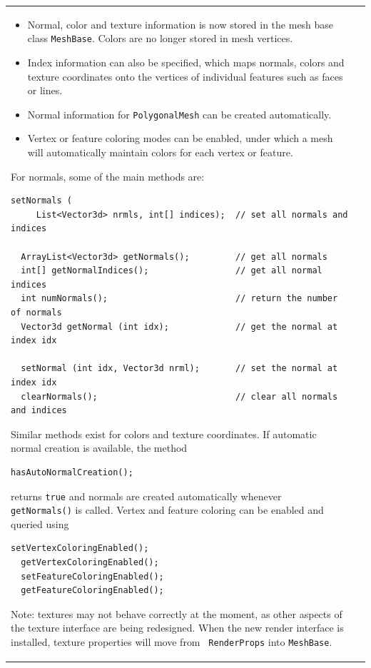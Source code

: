 \documentclass{article}
\begin{document}
\begin{tabular}{ll}
\begin{itemize}

\item Normal, color and texture information is now stored in the mesh
base class {\tt MeshBase}. Colors are no longer stored in mesh vertices.

\item Index information can also be specified, which maps normals,
colors and texture coordinates onto the vertices of individual
features such as faces or lines.

\item Normal information for {\tt PolygonalMesh} can be created
automatically.

\item Vertex or feature coloring modes can be enabled, under which a
mesh will automatically maintain colors for each vertex or feature.

\end{itemize}
%
For normals, some of the main methods are:
%
\begin{lstlisting}[]
  setNormals (
     List<Vector3d> nrmls, int[] indices);  // set all normals and indices

  ArrayList<Vector3d> getNormals();         // get all normals
  int[] getNormalIndices();                 // get all normal indices
  int numNormals();                         // return the number of normals
  Vector3d getNormal (int idx);             // get the normal at index idx

  setNormal (int idx, Vector3d nrml);       // set the normal at index idx
  clearNormals();                           // clear all normals and indices
\end{lstlisting}
%

Similar methods exist for colors and texture coordinates. If automatic
normal creation is available, the method
%
\begin{lstlisting}[]
  hasAutoNormalCreation();
\end{lstlisting}
%
returns {\tt true} and normals are created automatically whenever {\tt
getNormals()} is called. Vertex and feature coloring can be enabled
and queried using
%
\begin{lstlisting}[]
  setVertexColoringEnabled();
  getVertexColoringEnabled();
  setFeatureColoringEnabled();
  getFeatureColoringEnabled();
\end{lstlisting}
%

\begin{sideblock}
Note: textures may not behave correctly at the moment, as other
aspects of the texture interface are being redesigned. When the new
render interface is installed, texture properties will move from {\tt
RenderProps} into {\tt MeshBase}.
\end{sideblock}



\end{tabular}
\end{document}
